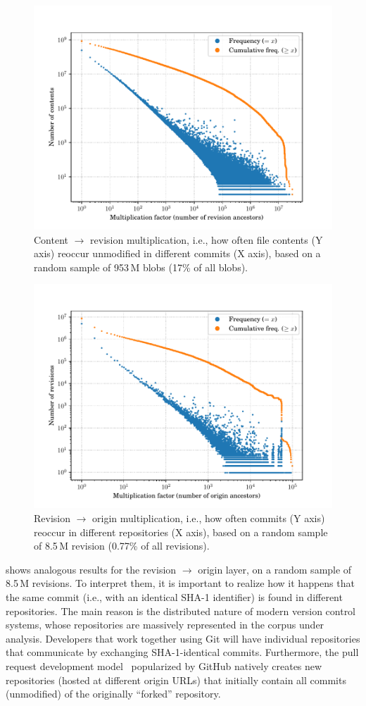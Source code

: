 \begin{figure}
  \centering
  \includegraphics[width=0.7\linewidth]{img/compression/distributions/contents}
  \caption{Content $\to$ revision multiplication, i.e., how often file contents
    (Y axis) reoccur unmodified in different commits (X axis), based on a
    random sample of 953\,M blobs (17\% of all blobs).}%
  \label{fig:compression-distrib-cnt-rev}
\end{figure}

\begin{figure}
  \centering
  \includegraphics[width=0.7\linewidth]{img/compression/distributions/revisions}
  \caption{Revision $\to$ origin multiplication, i.e., how often commits (Y
  axis) reoccur in different repositories (X axis), based on a random sample of
  8.5\,M revision (0.77\% of all revisions).}%
  \label{fig:compression-distrib-rev-ori}
\end{figure}

 shows analogous results for the revision
$\to$ origin layer, on a random sample of 8.5\,M revisions. To interpret them,
it is important to realize how it happens that the same commit (i.e., with an
identical SHA-1 identifier) is found in different repositories. The main reason
is the distributed nature of modern version control systems, whose repositories
are massively represented in the corpus under analysis. Developers that work
together using Git will have individual repositories that communicate by
exchanging SHA-1-identical commits. Furthermore, the pull request development
model~\cite{gousios2014pullrequests} popularized by GitHub natively creates new
repositories (hosted at different origin URLs) that initially contain all
commits (unmodified) of the originally ``forked'' repository.

